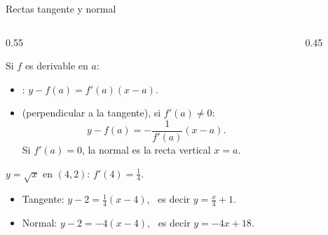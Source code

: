 \documentclass[10pt,aspectratio=169]{beamer}
\begin{document}
\begin{frame}{Rectas tangente y normal}
  \begin{columns}
    \begin{column}{0.55\textwidth}
      \begin{definicion}
        Si $f$ es derivable en $a$:
        \begin{itemize}
          \item {}: \quad $y-f(a)=f'(a)(x-a)$.
          \item {} (perpendicular a la tangente), si $f'(a)\neq0$:
            \[ y-f(a)=-\frac{1}{f'(a)}(x-a). \]
            Si $f'(a)=0$, la normal es la recta vertical $x=a$.
        \end{itemize}
      \end{definicion}
      \begin{ejemplo}[5]
        $y=\sqrt x$ en $(4,2)$: $f'(4)=\frac14$.
        \begin{itemize}
          \item Tangente: $y-2=\frac14(x-4)$, \ es decir $y=\frac x4+1$.
          \item Normal: $y-2=-4(x-4)$, \ es decir $y=-4x+18$.
        \end{itemize}
      \end{ejemplo}
    \end{column}
    \begin{column}{0.45\textwidth}
      \centering
    \end{column}
  \end{columns}
\end{frame}
\end{document}
